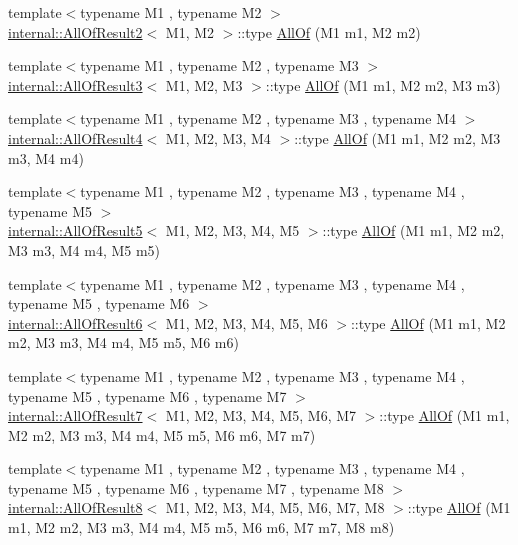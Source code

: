 \begin{DoxyCompactItemize}
\item 
{\footnotesize template$<$typename M1 , typename M2 $>$ }\\\hyperlink{structtesting_1_1internal_1_1AllOfResult2}{internal\+::\+All\+Of\+Result2}$<$ M1, M2 $>$\+::type \hyperlink{namespacetesting_af7618e8606c1cb45738163688944e2b7}{All\+Of} (M1 m1, M2 m2)
\item 
{\footnotesize template$<$typename M1 , typename M2 , typename M3 $>$ }\\\hyperlink{structtesting_1_1internal_1_1AllOfResult3}{internal\+::\+All\+Of\+Result3}$<$ M1, M2, M3 $>$\+::type \hyperlink{namespacetesting_a75934d8ea6b986d2157a5ebfe68f9904}{All\+Of} (M1 m1, M2 m2, M3 m3)
\item 
{\footnotesize template$<$typename M1 , typename M2 , typename M3 , typename M4 $>$ }\\\hyperlink{structtesting_1_1internal_1_1AllOfResult4}{internal\+::\+All\+Of\+Result4}$<$ M1, M2, M3, M4 $>$\+::type \hyperlink{namespacetesting_a4a9a119cde16e43b364f3573136857a1}{All\+Of} (M1 m1, M2 m2, M3 m3, M4 m4)
\item 
{\footnotesize template$<$typename M1 , typename M2 , typename M3 , typename M4 , typename M5 $>$ }\\\hyperlink{structtesting_1_1internal_1_1AllOfResult5}{internal\+::\+All\+Of\+Result5}$<$ M1, M2, M3, M4, M5 $>$\+::type \hyperlink{namespacetesting_ab8f5e6cf1c22acf51a2b9b376b0ef03a}{All\+Of} (M1 m1, M2 m2, M3 m3, M4 m4, M5 m5)
\item 
{\footnotesize template$<$typename M1 , typename M2 , typename M3 , typename M4 , typename M5 , typename M6 $>$ }\\\hyperlink{structtesting_1_1internal_1_1AllOfResult6}{internal\+::\+All\+Of\+Result6}$<$ M1, M2, M3, M4, M5, M6 $>$\+::type \hyperlink{namespacetesting_afc8e2d405f80e7d3df32842ddb648125}{All\+Of} (M1 m1, M2 m2, M3 m3, M4 m4, M5 m5, M6 m6)
\item 
{\footnotesize template$<$typename M1 , typename M2 , typename M3 , typename M4 , typename M5 , typename M6 , typename M7 $>$ }\\\hyperlink{structtesting_1_1internal_1_1AllOfResult7}{internal\+::\+All\+Of\+Result7}$<$ M1, M2, M3, M4, M5, M6, M7 $>$\+::type \hyperlink{namespacetesting_acbd4eef50126ff6db5b93ac5faa71b45}{All\+Of} (M1 m1, M2 m2, M3 m3, M4 m4, M5 m5, M6 m6, M7 m7)
\item 
{\footnotesize template$<$typename M1 , typename M2 , typename M3 , typename M4 , typename M5 , typename M6 , typename M7 , typename M8 $>$ }\\\hyperlink{structtesting_1_1internal_1_1AllOfResult8}{internal\+::\+All\+Of\+Result8}$<$ M1, M2, M3, M4, M5, M6, M7, M8 $>$\+::type \hyperlink{namespacetesting_a7ec0bc4eca9805e85b9b34bbbf3d3ae2}{All\+Of} (M1 m1, M2 m2, M3 m3, M4 m4, M5 m5, M6 m6, M7 m7, M8 m8)

\end{DoxyCompactItemize}
